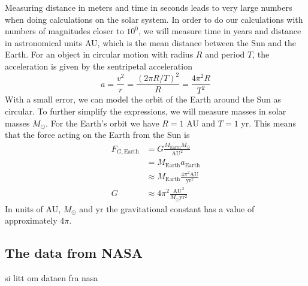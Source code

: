 \documentclass[reprint, english,notitlepage,nofootinbib]{revtex4-1}  %
\begin{document}
Measuring distance in meters and time in seconds leads to very large numbers when doing calculations on the solar system. In order to do our calculations with numbers of magnitudes closer to $10^0$, we will measure time in years and distance in astronomical units AU, which is the mean distance between the Sun and the Earth. For an object in circular motion with radius $R$ and period $T$, the acceleration is given by the sentripetal acceleration
\begin{equation*}
  a = \frac{v^2}{r} = \frac{(2 \pi R / T)^2}{R} = \frac{4 \pi^2 R}{T^2}
\end{equation*}
With a small error, we can model the orbit of the Earth around the Sun as circular. To further simplify the expressions, we will measure masses in solar masses $M_\odot$. For the Earth's orbit we have $R = 1$ AU and $T = 1$ yr. This means that the force acting on the Earth from the Sun is
\begin{align*}
  F_{G, \text{Earth}} &= G \frac{M_{\text{Earth}} M_\odot}{\text{AU}^2} \\
  &= M_{\text{Earth}} a_{\text{Earth}} \\
  &\approx M_{\text{Earth}} \frac{4 \pi^2 \text{AU}}{\text{yr}^2} \\
  G &\approx 4 \pi^2 \frac{\text{AU}^3}{M_\odot \text{yr}^2}
\end{align*}
In units of AU, $M_\odot$ and yr the gravitational constant has a value of approximately $4 \pi$.

\subsection{The data from NASA}
si litt om dataen fra nasa
\end{document}
